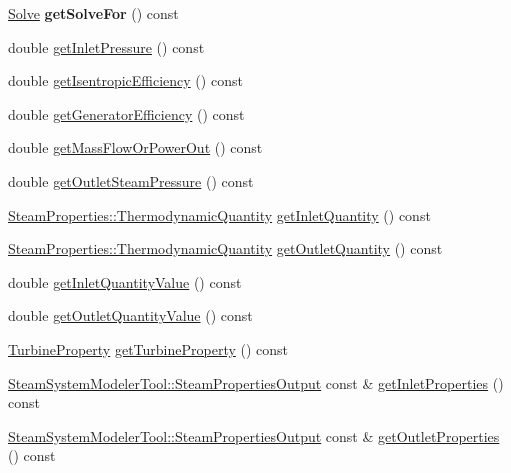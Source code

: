 \begin{DoxyCompactItemize}
\item 
\mbox{\label{class_turbine_a58c73057a4b890eab2af2b42c82484e6}} 
\hyperlink{class_turbine_a9fd7beba6c6f071e228fbe3e07969d2b}{Solve} {\bfseries get\+Solve\+For} () const
\item 
double \hyperlink{class_turbine_a148ad3877851f1c3931d8a6771d750c5}{get\+Inlet\+Pressure} () const
\item 
double \hyperlink{class_turbine_a5d907859de4acc153a32bd443238b445}{get\+Isentropic\+Efficiency} () const
\item 
double \hyperlink{class_turbine_a92266fd994310d1842ba37c05bc40bf8}{get\+Generator\+Efficiency} () const
\item 
double \hyperlink{class_turbine_a820a090d264b96ee84f717555545c287}{get\+Mass\+Flow\+Or\+Power\+Out} () const
\item 
double \hyperlink{class_turbine_a1589b2364a553db7aaa875bb543d171d}{get\+Outlet\+Steam\+Pressure} () const
\item 
\hyperlink{class_steam_properties_ae0294bedf7d178c2d8fb6aed0f62fbff}{Steam\+Properties\+::\+Thermodynamic\+Quantity} \hyperlink{class_turbine_ac9e91d9539cea5cd1e0037c397c28c78}{get\+Inlet\+Quantity} () const
\item 
\hyperlink{class_steam_properties_ae0294bedf7d178c2d8fb6aed0f62fbff}{Steam\+Properties\+::\+Thermodynamic\+Quantity} \hyperlink{class_turbine_acd3e98ab67754b652de97498d9bec6d2}{get\+Outlet\+Quantity} () const
\item 
double \hyperlink{class_turbine_a3d8a3f317fa71abb3404144371615725}{get\+Inlet\+Quantity\+Value} () const
\item 
double \hyperlink{class_turbine_aca98f128213e02e95dfd6f4b2ad8de4e}{get\+Outlet\+Quantity\+Value} () const
\item 
\hyperlink{class_turbine_a5db4f65cf2539e3837684d53221ade12}{Turbine\+Property} \hyperlink{class_turbine_a14f6eff49b501aa8c5a22d404dbeaac0}{get\+Turbine\+Property} () const
\item 
\hyperlink{struct_steam_system_modeler_tool_1_1_steam_properties_output}{Steam\+System\+Modeler\+Tool\+::\+Steam\+Properties\+Output} const  \& \hyperlink{class_turbine_a7a906cf74affed9acfa4045964eccbf6}{get\+Inlet\+Properties} () const
\item 
\hyperlink{struct_steam_system_modeler_tool_1_1_steam_properties_output}{Steam\+System\+Modeler\+Tool\+::\+Steam\+Properties\+Output} const  \& \hyperlink{class_turbine_aa9449622449e78285a258823ff77c8ec}{get\+Outlet\+Properties} () const

\end{DoxyCompactItemize}
